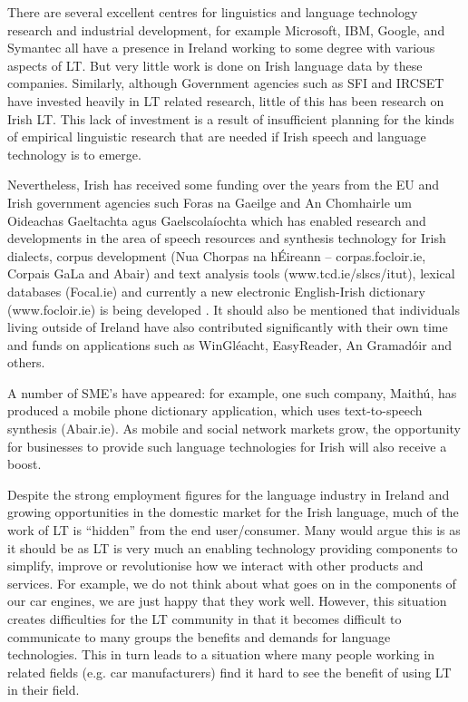 \begin{multicols}{2}
There are several excellent centres for linguistics and language technology research and industrial development, for example Microsoft, IBM, Google, and Symantec all have a presence in Ireland working to some degree with various aspects of LT. But very little work is done on Irish language data by these companies. Similarly, although Government agencies such as SFI and IRCSET have invested heavily in LT related research, little of this has been research on Irish LT. This lack of investment is a result of insufficient planning for the kinds of empirical linguistic research that are needed if Irish speech and language technology is to emerge. 

Nevertheless, Irish has received some funding over the years from the EU and Irish government agencies such Foras na Gaeilge and An Chomhairle um Oideachas Gaeltachta agus Gaelscolaíochta which has enabled research and developments in the area of speech resources and synthesis technology for Irish dialects, corpus development (Nua Chorpas na hÉireann -- corpas.focloir.ie, Corpais GaLa and Abair) and text analysis tools (www.tcd.ie/slscs/itut), lexical databases (Focal.ie) and currently  a new electronic English-Irish dictionary (www.focloir.ie)  is being developed . It should also be mentioned that individuals living outside of Ireland have also contributed significantly with their own time and funds on applications such as WinGléacht, EasyReader, An Gramadóir and others.

A number of SME's have appeared: for example, one such company, Maithú, has produced a mobile phone dictionary application, which uses text-to-speech synthesis (Abair.ie). As mobile and social network markets grow, the opportunity for businesses to provide such language technologies for Irish will also receive a boost.

Despite the strong employment figures for the language industry in Ireland and growing opportunities in the domestic market for the Irish language, much of the work of LT is ``hidden'' from the end user/consumer. Many would argue this is as it should be as LT is very much an enabling technology providing components to simplify, improve or revolutionise how we interact with other products and services. For example, we do not think about what goes on in the components of our car engines, we are just happy that they work well. However, this situation creates difficulties for the LT community in that it becomes difficult to communicate to many groups the benefits and demands for language technologies. This in turn leads to a situation where many people working in related fields (e.g. car manufacturers) find it hard to see the benefit of using LT in their field.


\end{multicols}
